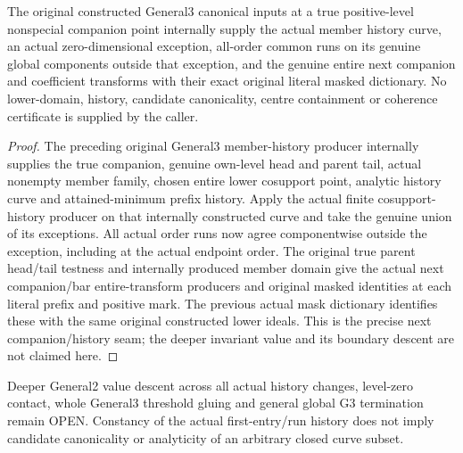 \begin{theorem}
\label{hir:member-companion-actual-general-three-consumer}
\leanok
The original constructed General3 canonical inputs at a true positive-level
nonspecial companion point internally supply the actual member history curve,
an actual zero-dimensional exception, all-order common runs on its genuine
global components outside that exception, and the genuine entire next companion
and coefficient transforms with their exact original literal masked dictionary.
No lower-domain, history, candidate canonicality, centre containment or
coherence certificate is supplied by the caller.
\end{theorem}
\begin{proof}
The preceding original General3 member-history producer internally supplies
the true companion, genuine own-level head and parent tail, actual nonempty
member family, chosen entire lower cosupport point, analytic history curve
and attained-minimum prefix history. Apply the actual finite cosupport-history
producer on that internally constructed curve and take the genuine union of
its exceptions. All actual order runs now agree componentwise outside the
exception, including at the actual endpoint order. The original true parent
head/tail testness and internally produced member domain give the actual
next companion/bar entire-transform producers and original masked identities
at each literal prefix and positive mark. The previous actual mask dictionary
identifies these with the same original constructed lower ideals. This is
the precise next companion/history seam; the deeper invariant value and its
boundary descent are not claimed here.
\end{proof}

\begin{remark}
Deeper General2 value descent across all actual history changes, level-zero
contact, whole General3 threshold gluing and general global G3 termination
remain OPEN. Constancy of the actual first-entry/run history does not imply
candidate canonicality or analyticity of an arbitrary closed curve subset.
\end{remark}
